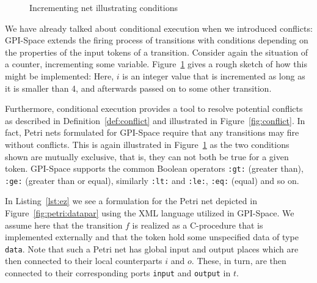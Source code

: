 \documentclass[
  paper=a4,
  titlepage,
  bibliography=totoc,
  pagesize=pdftex
]{scrartcl}
\numberwithin{figure}{section}
\numberwithin{equation}{section}
\numberwithin{table}{section}
\theoremstyle{definition}
\numberwithin{definition}{section}
\begin{document}
\begin{figure}[htbp]
  \centering
  \caption{Incrementing net illustrating conditions}
  \label{fig:inc}
\end{figure}

We have already talked about conditional execution when we introduced conflicts: GPI-Space
extends the firing process of transitions with conditions depending on the properties of
the input tokens of a transition. Consider again the situation of a counter, incrementing
some variable. Figure~\ref{fig:inc} gives a rough sketch of how this might be implemented:
Here, $i$ is an integer value that is incremented as long as it is smaller than 4, and
afterwards passed on to some other transition.

Furthermore, conditional execution provides a tool to resolve potential conflicts as
described in Definition~\ref{def:conflict} and illustrated in Figure~\ref{fig:conflict}.
In fact, Petri nets formulated for GPI-Space require that any transitions may fire without
conflicts. This is again illustrated in Figure~\ref{fig:inc} as the two conditions shown
are mutually exclusive, that is, they can not both be true for a given token. GPI-Space
supports the common Boolean operators \texttt{:gt:} (greater than), \texttt{:ge:} (greater
than or equal), similarly \texttt{:lt:} and \texttt{:le:}, \texttt{:eq:} (equal) and so
on.

In Listing~\ref{lst:ez} we see a formulation for the Petri net depicted in
Figure~\ref{fig:petri:datapar} using the XML language utilized in GPI-Space. We assume
here that the transition $f$ is realized as a C-procedure that is implemented externally
and that the token hold some unspecified data of type \texttt{data}. Note that such a
Petri net has global input and output places which are then connected to their local
counterparts $i$ and $o$. These, in turn, are then connected to their corresponding ports
\texttt{input} and \texttt{output} in $t$.
\end{document}
